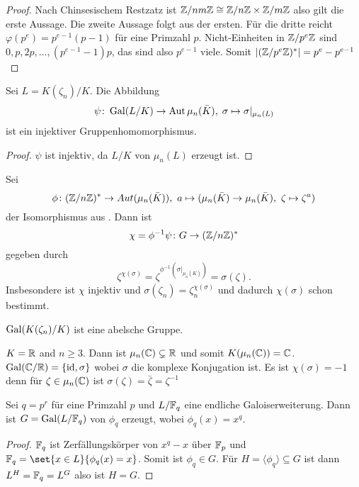 \begin{proof}
	Nach Chinsesischem Restzatz ist \(\mathbb{Z}/nm\mathbb{Z}\cong \mathbb{Z}/n\mathbb{Z}\times \mathbb{Z}/m\mathbb{Z}\) also gilt die erste Aussage. Die zweite Aussage folgt aus der ersten.
	Für die dritte reicht \(\varphi(p^e)=p^{e-1}(p-1)\) für eine Primzahl \(p\).
	Nicht-Einheiten in \(\mathbb{Z}/p^e\mathbb{Z}\) sind \(0,p,2p,\dots,(p^{e-1}-1)p\), das sind also \(p^{e-1}\) viele. Somit \(|(\mathbb{Z}/p^e\mathbb{Z})^*|=p^e-p^{e-1}\)
\end{proof}
\begin{Satz}
	Sei \(L=K(\zeta_n)/K\). Die Abbildung 
	\[\psi\colon\operatorname{Gal}(L/K)\to\operatorname{Aut}\mu_n(\bar K),\; \sigma\mapsto \sigma|_{\mu_n(L)}\] ist ein injektiver Gruppenhomomorphismus.
\end{Satz}
\begin{proof}
	\(\psi\) ist injektiv, da \(L/K\) von \(\mu_n(L)\) erzeugt ist.
\end{proof}
\begin{Kor}\label{Kor:ChiGal}
	Sei \[\phi\colon(\ZZ/n\ZZ)^*\to Aut(\mu_n(\bar K)),\ a\mapsto (\mu_n(\bar K)\to\mu_n(\bar K),\ \zeta\mapsto \zeta^a)\] der Isomorphismus aus .
	Dann ist \[\chi=\phi^{-1}\psi\colon G\to (\mathbb{Z}/n\mathbb{Z})^* \] gegeben durch \[\zeta^{\chi(\sigma)}=\zeta^{\phi^{-1}(\sigma|_{\mu_n(\bar K)})}=\sigma(\zeta).\]
	Insbesondere ist \(\chi\) injektiv und \(\sigma(\zeta_n)=\zeta_n^{\chi(\sigma)}\) und dadurch \(\chi(\sigma)\) schon bestimmt.
\end{Kor}
\begin{Kor}
	\(\operatorname{Gal}(K(\zeta_n)/K)\) ist eine abelsche Gruppe.
\end{Kor}
\begin{Bsp}
	\(K=\mathbb{R}\) and \(n\geq 3\). Dann ist \(\mu_n(\mathbb{C})\subsetneq\mathbb{R}\) und somit \(K(\mu_n(\mathbb{C}))=\mathbb{C}\).
	\(\operatorname{Gal}(\mathbb{C}/\mathbb{R})=\{\mathrm{id},\sigma\}\) wobei \(\sigma\) die komplexe Konjugation ist. Es ist \(\chi(\sigma)=-1\) denn
	für \(\zeta\in\mu_n(\mathbb{C})\) ist \(\sigma(\zeta)=\bar\zeta=\zeta^{-1}\)
\end{Bsp}
\begin{Satz}
	Sei \(q=p^r\) für eine Primzahl \(p\) und \(L/\mathbb{F}_q\) eine endliche Galoiserweiterung. Dann ist \(G=\operatorname{Gal}(L/\mathbb{F}_q)\) von \(\phi_q\) erzeugt, wobei \(\phi_q(x)=x^q\).
\end{Satz}
\begin{proof}
	\(\mathbb{F}_q\) ist Zerfällungskörper von \(x^q-x\) über \(\mathbb{F}_p\) und
	\(\FF_q=\set{x\in L}{ \phi_q(x)=x}\). Somit ist \(\phi_q\in G\).
	Für \(H=\langle \phi_q\rangle\subseteq G\) ist 
	dann \(L^H=\mathbb{F}_q=L^G\) also ist \(H=G\).
\end{proof}
